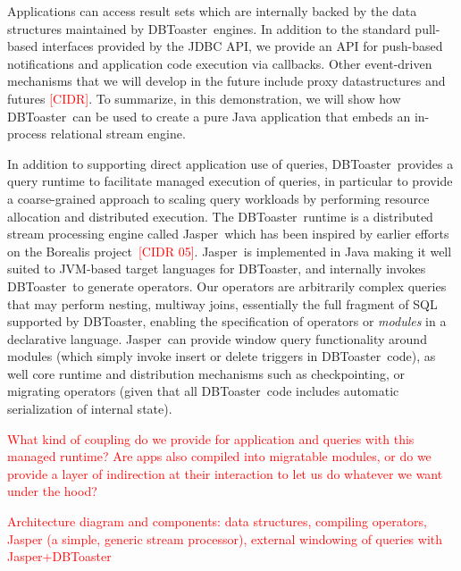 \documentclass{vldb}
\newcommand{\tinysection}[1]{\noindent{\bf #1.}}
\newcommand{\todo}[1]{\textcolor{red}{#1}}
\newcommand{\compiler}{DBToaster}
\newcommand{\spe}{Jasper}
\begin{document}
Applications can access
result sets which are internally backed by the data structures maintained by
\compiler\ engines. In addition to the standard pull-based interfaces provided
by the JDBC API, we provide an API for push-based notifications and application
code execution via callbacks. Other event-driven mechanisms that we will develop
in the future include proxy datastructures and futures \todo{[CIDR]}. To
summarize, in this demonstration, we will show how \compiler\ can be used to
create a pure Java application that embeds an in-process relational stream
engine.


\tinysection{The DBToaster Runtime}
In addition to supporting direct application use of queries, \compiler\ provides
a query runtime to facilitate managed execution of queries, in particular to
provide a coarse-grained approach to scaling query workloads by performing
resource allocation and distributed execution. The \compiler\ runtime is a
distributed stream processing engine called \spe\ which has been inspired by
earlier efforts on the Borealis project~\todo{[CIDR 05]}. \spe\ is
implemented in Java making it well suited to JVM-based target
languages for \compiler, and internally invokes \compiler\ to generate
operators. Our operators are arbitrarily complex queries that may
perform nesting, multiway joins, essentially the full fragment of SQL
supported by \compiler, enabling the specification of operators or
\textit{modules} in a declarative language. \spe\ can provide window query
functionality around modules (which simply invoke insert or delete triggers in
\compiler\ code), as well core runtime and distribution mechanisms such as
checkpointing, or migrating operators (given that all \compiler\ code includes
automatic serialization of internal state).

\todo{What kind of coupling do we provide for application and queries with this
managed runtime? Are apps also compiled into migratable modules, or do we
provide a layer of indirection at their interaction to let us do whatever we
want under the hood?}

\todo{Architecture diagram and components: data structures, compiling
operators, Jasper (a simple, generic stream processor), external windowing of
queries with Jasper+DBToaster}
\end{document}
